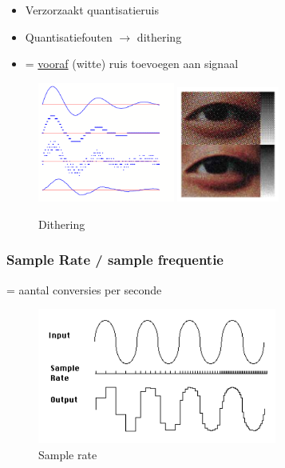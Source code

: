 \documentclass{article}
\begin{document}
\begin{itemize}
    \item Verzorzaakt quantisatieruis
    \item Quantisatiefouten $\rightarrow$ dithering
    \item = \underline{vooraf} (witte) ruis toevoegen aan signaal
\end{itemize}

\begin{figure}[H]
    \centering
    \centerline{
        \includegraphics[width=0.4\textwidth]{Screenshot_20200224_121151.png}
        \includegraphics[width=0.3\textwidth]{Screenshot_20200315_122540.png}
    }
    \caption{Dithering}
\end{figure}

\subsubsection{Sample Rate / sample frequentie}
= aantal conversies per seconde
\begin{figure}[H]
    \centering
    \includegraphics[width=0.7\textwidth]{Screenshot_20200224_121653.png}
    \caption{Sample rate}
\end{figure}
\end{document}
